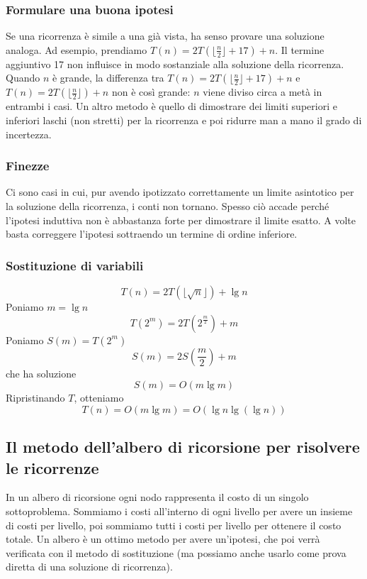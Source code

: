 \documentclass[11pt,a4paper]{article}
\begin{document}
\subsubsection{Formulare una buona ipotesi}
Se una ricorrenza è simile a una già vista, ha senso provare una soluzione analoga.
Ad esempio, prendiamo $T(n) = 2T(\lfloor \frac{n}{2} \rfloor + 17 ) + n$.
Il termine aggiuntivo 17 non influisce in modo sostanziale alla soluzione della ricorrenza. Quando $n$ è grande,
la differenza tra $T(n) = 2T(\lfloor \frac{n}{2} \rfloor + 17 ) + n$ e $T(n) = 2T(\lfloor \frac{n}{2} \rfloor) + n$ non è così grande: $n$ viene diviso circa
a metà in entrambi i casi.
Un altro metodo è quello di dimostrare dei limiti superiori e inferiori laschi (non stretti) per la ricorrenza e poi
ridurre man a mano il grado di incertezza.

\subsubsection{Finezze}
Ci sono casi in cui, pur avendo ipotizzato correttamente un limite asintotico per la soluzione della ricorrenza, i conti non tornano. Spesso ciò accade perché l’ipotesi induttiva non è abbastanza forte per dimostrare il limite esatto. A volte basta correggere l’ipotesi sottraendo un termine di ordine inferiore.

\subsubsection{Sostituzione di variabili}
\[T(n) = 2T(\lfloor\sqrt{n}\rfloor) + \lg n\]
Poniamo $m = \lg n$
\[T(2^m) = 2T(2^{\frac{m}{2}}) + m\]
Poniamo $S(m) = T(2^m)$
\[S(m) = 2S(\frac{m}{2}) + m\]
che ha soluzione
\[S(m) = O(m \lg m)\]
Ripristinando $T$, otteniamo \[T(n) = O(m \lg m) = O(\lg n \lg (\lg n))\]

\subsection{Il metodo dell’albero di ricorsione per risolvere le ricorrenze}
In un albero di ricorsione ogni nodo rappresenta il costo di un singolo sottoproblema. Sommiamo i costi
all’interno di ogni livello per avere un insieme di costi per livello, poi sommiamo tutti i costi per livello per
ottenere il costo totale.
Un albero è un ottimo metodo per avere un’ipotesi, che poi verrà verificata con il metodo di sostituzione (ma
possiamo anche usarlo come prova diretta di una soluzione di ricorrenza).
\end{document}
